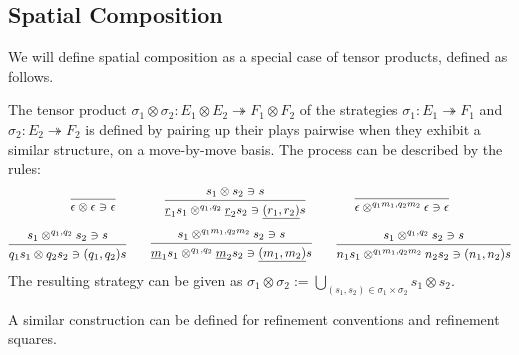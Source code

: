 \documentclass[acmsmall,screen,review,anonymous,nonacm]{acmart}
\begin{document}
\subsection{Spatial Composition}

We will define spatial composition as a special case of tensor products,
defined as follows.

\begin{definition}
The tensor product
$\sigma_1 \otimes \sigma_2 : E_1 \otimes E_2 \twoheadrightarrow F_1 \otimes F_2$
of the strategies
$\sigma_1 : E_1 \twoheadrightarrow F_1$ and
$\sigma_2 : E_2 \twoheadrightarrow F_2$
is defined by pairing up their plays pairwise
when they exhibit a similar structure, on a move-by-move basis.
The process can be described by the rules:
\begin{gather*}
  \qquad
  \begin{prooftree}
    \infer0{\epsilon \otimes \epsilon &\ni \epsilon}
  \end{prooftree}
  \qquad\qquad
  \begin{prooftree}
    \hypo{s_1 \otimes s_2 \ni s}
    \infer1{
      \underline{r}_1 s_1 \otimes^{q_1,q_2} \underline{r}_2 s_2 \ni
      \underline{(r_1, r_2)} s
    }
  \end{prooftree}
  \qquad\qquad
  \begin{prooftree}
    \infer0{\epsilon \otimes^{q_1m_1,q_2m_2} \epsilon \ni \epsilon}
  \end{prooftree}
  \qquad
  \\[1ex]
  \begin{prooftree}
    \hypo{s_1 \otimes^{q_1,q_2} s_2 \ni s}
    \infer1{q_1 s_1 \otimes q_2 s_2 \ni (q_1, q_2) s}
  \end{prooftree}
  \qquad
  \begin{prooftree}
    \hypo{s_1 \otimes^{q_1m_1,q_2m_2} s_2 \ni s}
    \infer1{
      \underline{m}_1 s_1 \otimes^{q_1,q_2} \underline{m}_2 s_2 \ni
      \underline{(m_1, m_2)} s
    }
  \end{prooftree}
  \qquad
  \begin{prooftree}
    \hypo{s_1 \otimes^{q_1,q_2} s_2 \ni s}
    \infer1{n_1s_1 \otimes^{q_1m_1,q_2m_2} n_2s_2 \ni (n_1,n_2)s}
  \end{prooftree}
\end{gather*}
The resulting strategy can be given as
$\sigma_1 \otimes \sigma_2 :=
 \bigcup_{(s_1, s_2) \in \sigma_1 \times \sigma_2} s_1 \otimes s_2$.
\end{definition}

A similar construction can be defined for
refinement conventions and refinement squares.
\end{document}
